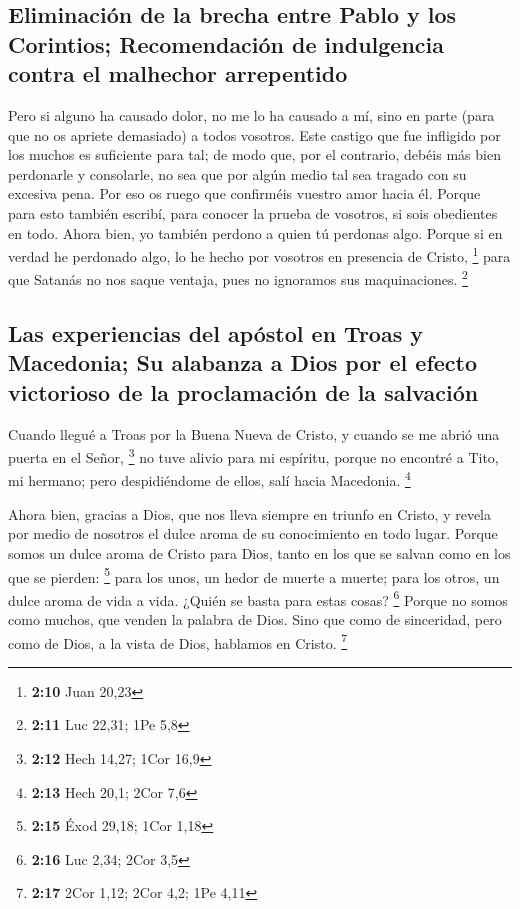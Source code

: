 \hypertarget{eliminaciuxf3n-de-la-brecha-entre-pablo-y-los-corintios-recomendaciuxf3n-de-indulgencia-contra-el-malhechor-arrepentido}{%
\subsection{Eliminación de la brecha entre Pablo y los Corintios;
Recomendación de indulgencia contra el malhechor
arrepentido}\label{eliminaciuxf3n-de-la-brecha-entre-pablo-y-los-corintios-recomendaciuxf3n-de-indulgencia-contra-el-malhechor-arrepentido}}

 Pero si alguno ha causado dolor, no me lo ha causado a
mí, sino en parte (para que no os apriete demasiado) a todos vosotros.
 Este castigo que fue infligido por los muchos es
suficiente para tal;  de modo que, por el contrario,
debéis más bien perdonarle y consolarle, no sea que por algún medio tal
sea tragado con su excesiva pena.  Por eso os ruego que
confirméis vuestro amor hacia él.  Porque para esto
también escribí, para conocer la prueba de vosotros, si sois obedientes
en todo.  Ahora bien, yo también perdono a quien tú
perdonas algo. Porque si en verdad he perdonado algo, lo he hecho por
vosotros en presencia de Cristo, \footnote{\textbf{2:10} Juan 20,23}
 para que Satanás no nos saque ventaja, pues no ignoramos
sus maquinaciones. \footnote{\textbf{2:11} Luc 22,31; 1Pe 5,8}

\hypertarget{las-experiencias-del-apuxf3stol-en-troas-y-macedonia-su-alabanza-a-dios-por-el-efecto-victorioso-de-la-proclamaciuxf3n-de-la-salvaciuxf3n}{%
\subsection{Las experiencias del apóstol en Troas y Macedonia; Su
alabanza a Dios por el efecto victorioso de la proclamación de la
salvación}\label{las-experiencias-del-apuxf3stol-en-troas-y-macedonia-su-alabanza-a-dios-por-el-efecto-victorioso-de-la-proclamaciuxf3n-de-la-salvaciuxf3n}}

 Cuando llegué a Troas por la Buena Nueva de Cristo, y
cuando se me abrió una puerta en el Señor, \footnote{\textbf{2:12} Hech
  14,27; 1Cor 16,9}  no tuve alivio para mi espíritu,
porque no encontré a Tito, mi hermano; pero despidiéndome de ellos, salí
hacia Macedonia. \footnote{\textbf{2:13} Hech 20,1; 2Cor 7,6}

 Ahora bien, gracias a Dios, que nos lleva siempre en
triunfo en Cristo, y revela por medio de nosotros el dulce aroma de su
conocimiento en todo lugar.  Porque somos un dulce aroma
de Cristo para Dios, tanto en los que se salvan como en los que se
pierden: \footnote{\textbf{2:15} Éxod 29,18; 1Cor 1,18} 
para los unos, un hedor de muerte a muerte; para los otros, un dulce
aroma de vida a vida. ¿Quién se basta para estas cosas? \footnote{\textbf{2:16}
  Luc 2,34; 2Cor 3,5}  Porque no somos como muchos, que
venden la palabra de Dios. Sino que como de sinceridad, pero como de
Dios, a la vista de Dios, hablamos en Cristo. \footnote{\textbf{2:17}
  2Cor 1,12; 2Cor 4,2; 1Pe 4,11}

